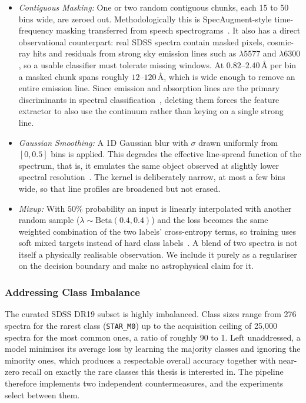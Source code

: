 \begin{itemize}
          applied after normalisation and acts as a $\pm 10\%$ amplitude jitter that
          prevents the network from keying on the exact post-normalisation scale.
    \item \textit{Contiguous Masking:} One or two random contiguous chunks, each 15 to 50
          bins wide, are zeroed out. Methodologically this is SpecAugment-style time-frequency
          masking transferred from speech spectrograms~\cite{park2019specaugment}. It also
          has a direct observational counterpart: real SDSS spectra contain masked pixels,
          cosmic-ray hits and residuals from strong sky emission lines such as
          $\lambda 5577$ and $\lambda 6300$, so a usable classifier must tolerate missing
          windows. At $0.82$--$2.40$\,\AA{} per bin a masked chunk spans roughly
          $12$--$120$\,\AA, which is wide enough to remove an entire emission line. Since
          emission and absorption lines are the primary discriminants in spectral
          classification~\cite{gray2005photospheres, baldwin1981bpt}, deleting them forces
          the feature extractor to also use the continuum rather than keying on a single
          strong line.
    \item \textit{Gaussian Smoothing:} A 1D Gaussian blur with $\sigma$ drawn uniformly
          from $[0,0.5]$ bins is applied. This degrades the effective line-spread function
          of the spectrum, that is, it emulates the same object observed at slightly lower
          spectral resolution~\cite{smee2013spectrographs}. The kernel is deliberately
          narrow, at most a few bins wide, so that line profiles are broadened but not
          erased.
    \item \textit{Mixup:} With $50\%$ probability an input is linearly interpolated with
          another random sample (\(\lambda \sim \text{Beta}(0.4,0.4)\)) and the loss becomes
          the same weighted combination of the two labels' cross-entropy terms, so training
          uses soft mixed targets instead of hard class labels~\cite{zhang2018mixup}. A
          blend of two spectra is not itself a physically realisable observation. We include
          it purely as a regulariser on the decision boundary and make no astrophysical
          claim for it.
\end{itemize}

\subsubsection{Addressing Class Imbalance}
\label{sec:imbalance}
The curated SDSS DR19 subset is highly imbalanced. Class sizes range from 276 spectra for
the rarest class (\texttt{STAR\_M0}) up to the acquisition ceiling of 25{,}000 spectra for
the most common ones, a ratio of roughly 90 to 1. Left unaddressed, a model minimises its
average loss by learning the majority classes and ignoring the minority ones, which
produces a respectable overall accuracy together with near-zero recall on exactly the rare
classes this thesis is interested in. The pipeline therefore implements two independent
countermeasures, and the experiments select between them.

